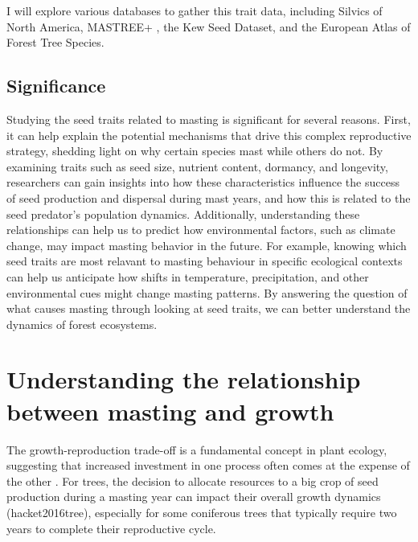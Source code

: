 \documentclass[11pt,letter]{article}
\begin{document}
I will explore various databases to gather this trait data, including Silvics of North America, MASTREE+ \citep{hacket2022mastree+}, the Kew Seed Dataset, and the European Atlas of Forest Tree Species.
\subsection{Significance} 
Studying the seed traits related to masting is significant for several reasons. First, it can help explain the potential mechanisms that drive this complex reproductive strategy, shedding light on why certain species mast while others do not. By examining traits such as seed size, nutrient content, dormancy, and longevity, researchers can gain insights into how these characteristics influence the success of seed production and dispersal during mast years, and how this is related to the seed predator's population dynamics.
Additionally, understanding these relationships can help us to predict how environmental factors, such as climate change, may impact masting behavior in the future. For example, knowing which seed traits are most relavant to masting behaviour in specific ecological contexts can help us anticipate how shifts in temperature, precipitation, and other environmental cues might change masting patterns. By answering the question of what causes masting through looking at seed traits, we can better understand the dynamics of forest ecosystems.

\section{Understanding the relationship between masting and growth}
The growth-reproduction trade-off is a fundamental concept in plant ecology, suggesting that increased investment in one process often comes at the expense of the other \citep{stearns1998evolution}. For trees, the decision to allocate resources to a big crop of seed production during a masting year can impact their overall growth dynamics (hacket2016tree), especially for some coniferous trees that typically require two years to complete their reproductive cycle.
\end{document}
